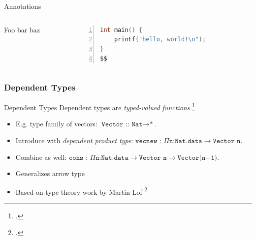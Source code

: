 \documentclass[aspectratio=169]{beamer}
\begin{document}

\begin{frame}[fragile]{Annotations}
  \footnotesize
  \begin{columns}[T]
    \begin{column}{0.45\textwidth}
        Foo bar baz
    \end{column}
    \begin{column}{0.45\textwidth}
%      
       \begin{lstlisting}[language=C,numbers=left,mathescape,basicstyle={\footnotesize\ttfamily}]
int main() {
    printf("hello, world!\n");
}
$$
        \end{lstlisting}
    \end{column}
  \end{columns}
\end{frame}

\subsubsection{Dependent Types}

\begin{frame}{Dependent Types}
    Dependent types are \emph{typed-valued functions} \footcite{pierce_advanced_2005}
    \begin{itemize}
        \item E.g. type family of vectors: $\texttt{Vector :: Nat}\rightarrow\texttt{*}$.
        \item Introduce with \emph{dependent product type}: $\texttt{vecnew : }\Pi\texttt{n:Nat.data}\rightarrow\texttt{Vector n}$.
        \item Combine as well: $\texttt{cons : }\Pi\texttt{n:Nat.data}\rightarrow\texttt{Vector n}\rightarrow\texttt{Vector(n+1)}$.
        \item Generalizes arrow type
        \item Based on type theory work by Martin-Lof \footcite{martin-lof_constructive_1984}
    \end{itemize}
\end{frame}
\end{document}
